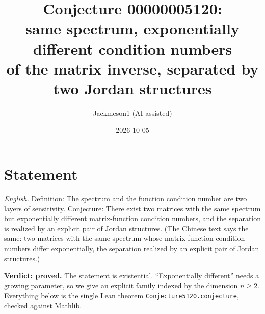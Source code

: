 \documentclass[11pt]{article}
\title{Conjecture 00000005120:\\ same spectrum, exponentially different condition numbers\\
of the matrix inverse, separated by two Jordan structures}
\author{Jackmeson1 (AI-assisted)}
\date{2026-10-05}
\renewcommand{\_}{\oldus\allowbreak}
\theoremstyle{remark}
\begin{document}
\maketitle

\section*{Statement}
\emph{English.} Definition: The spectrum and the function condition number are two layers
of sensitivity. Conjecture: There exist two matrices with the same spectrum but
exponentially different matrix-function condition numbers, and the separation is realized
by an explicit pair of Jordan structures.
(The Chinese text says the same: two matrices with the same spectrum whose matrix-function
condition numbers differ exponentially, the separation realized by an explicit pair of
Jordan structures.)

\textbf{Verdict: proved.} The statement is existential. ``Exponentially different'' needs a
growing parameter, so we give an explicit family indexed by the dimension $n\ge2$. Everything
below is the single Lean theorem \texttt{Conjecture5120.conjecture\_5120}, checked against
Mathlib.
\end{document}
